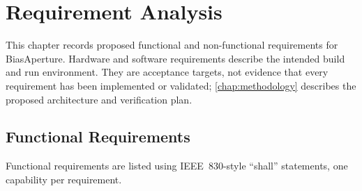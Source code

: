 \chapter{Requirement Analysis}
\label{chap:requirements}

This chapter records proposed functional and non-functional requirements for BiasAperture. Hardware and software requirements describe the intended build and run environment. They are acceptance targets, not evidence that every requirement has been implemented or validated; \cref{chap:methodology} describes the proposed architecture and verification plan.

\section{Functional Requirements}

Functional requirements are listed using IEEE~830-style ``shall'' statements, one capability per requirement.

